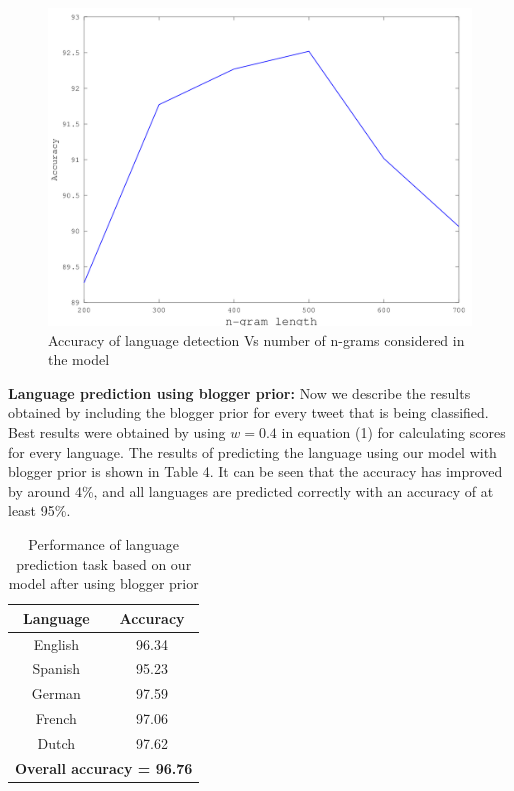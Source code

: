 \documentclass[11pt]{article}
\begin{document}
\begin{figure}[ht]
\includegraphics[scale=0.35]{ngramVsAccuracy.png}
\caption{\footnotesize Accuracy of language detection Vs number of n-grams considered in the model}
\label{fig:s3}
\end{figure}


{\textbf {Language prediction using blogger prior: }} Now we describe the results obtained by including the blogger prior for every tweet that is being classified. Best results were obtained by using $w = 0.4$ in equation (1) for calculating scores for every language. The results of predicting the language using our model with blogger prior is shown in Table 4. It can be seen that the accuracy has improved by around 4\%, and all languages are predicted correctly with an accuracy of at least 95\%.

\begin{table}
\begin{center}
\small
\begin{tabular}{|c|c|}
\hline
\textbf{Language} & \textbf{Accuracy} \\
\hline
English & 96.34 \\
Spanish & 95.23 \\
German & 97.59 \\
French & 97.06 \\
Dutch & 97.62 \\ \hline
\multicolumn{2}{|c|}{\textbf{Overall accuracy = 96.76}} \\\hline
\end{tabular}
\caption{\footnotesize Performance of language prediction task based on our model after using blogger prior}
\end{center}
\end{table}
\end{document}
